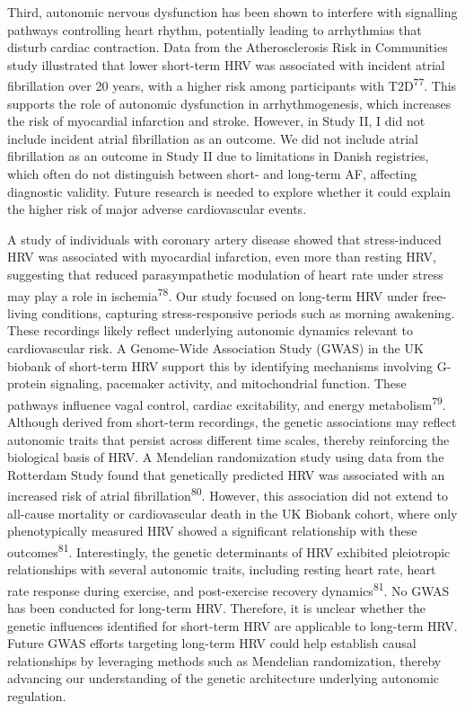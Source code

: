 \documentclass[
  a4paper,
  headsepline=true,
  open=any]{scrbook}
\begin{document}
Third, autonomic nervous dysfunction has been shown to interfere with
signalling pathways controlling heart rhythm, potentially leading to
arrhythmias that disturb cardiac contraction. Data from the
Atherosclerosis Risk in Communities study illustrated that lower
short-term HRV was associated with incident atrial fibrillation over 20
years, with a higher risk among participants with
T2D\textsuperscript{77}. This supports the role of autonomic dysfunction
in arrhythmogenesis, which increases the risk of myocardial infarction
and stroke. However, in Study II, I did not include incident atrial
fibrillation as an outcome. We did not include atrial fibrillation as an
outcome in Study II due to limitations in Danish registries, which often
do not distinguish between short- and long-term AF, affecting diagnostic
validity. Future research is needed to explore whether it could explain
the higher risk of major adverse cardiovascular events.

A study of individuals with coronary artery disease showed that
stress-induced HRV was associated with myocardial infarction, even more
than resting HRV, suggesting that reduced parasympathetic modulation of
heart rate under stress may play a role in ischemia\textsuperscript{78}.
Our study focused on long-term HRV under free-living conditions,
capturing stress-responsive periods such as morning awakening. These
recordings likely reflect underlying autonomic dynamics relevant to
cardiovascular risk. A Genome-Wide Association Study (GWAS) in the UK
biobank of short-term HRV support this by identifying mechanisms
involving G-protein signaling, pacemaker activity, and mitochondrial
function. These pathways influence vagal control, cardiac excitability,
and energy metabolism\textsuperscript{79}. Although derived from
short-term recordings, the genetic associations may reflect autonomic
traits that persist across different time scales, thereby reinforcing
the biological basis of HRV. A Mendelian randomization study using data
from the Rotterdam Study found that genetically predicted HRV was
associated with an increased risk of atrial
fibrillation\textsuperscript{80}. However, this association did not
extend to all-cause mortality or cardiovascular death in the UK Biobank
cohort, where only phenotypically measured HRV showed a significant
relationship with these outcomes\textsuperscript{81}. Interestingly, the
genetic determinants of HRV exhibited pleiotropic relationships with
several autonomic traits, including resting heart rate, heart rate
response during exercise, and post-exercise recovery
dynamics\textsuperscript{81}. No GWAS has been conducted for long-term
HRV. Therefore, it is unclear whether the genetic influences identified
for short-term HRV are applicable to long-term HRV. Future GWAS efforts
targeting long-term HRV could help establish causal relationships by
leveraging methods such as Mendelian randomization, thereby advancing
our understanding of the genetic architecture underlying autonomic
regulation.
\end{document}
